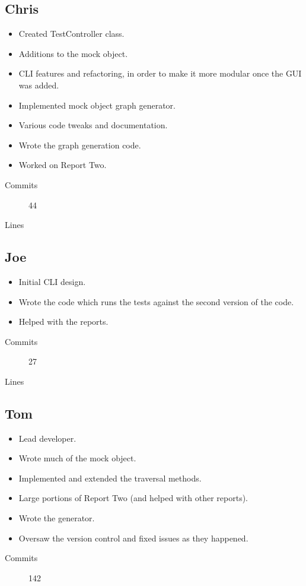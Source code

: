   \subsection{Chris}
    \begin{itemize}
     \item Created TestController class.
     \item Additions to the mock object.
     \item CLI features and refactoring, in order to make it more modular once the GUI was added.
     \item Implemented mock object graph generator.
     \item Various code tweaks and documentation.
     \item Wrote the graph generation code.
     \item Worked on Report Two.
    \end{itemize}
    \begin{description}
      \item[Commits] 44
      \item[Lines]
    \end{description}

  \subsection{Joe}
    \begin{itemize}
      \item Initial CLI design.
      \item Wrote the code which runs the tests against the second version of the code.
      \item Helped with the reports.
    \end{itemize}
    \begin{description}
      \item[Commits] 27
      \item[Lines]
    \end{description}

  \subsection{Tom}
    \begin{itemize}
      \item Lead developer.
      \item Wrote much of the mock object.
      \item Implemented and extended the traversal methods.
      \item Large portions of Report Two (and helped with other reports).
      \item Wrote the generator.
      \item Oversaw the version control and fixed issues as they happened.
    \end{itemize}
    \begin{description}
      \item[Commits] 142
    \end{description}
